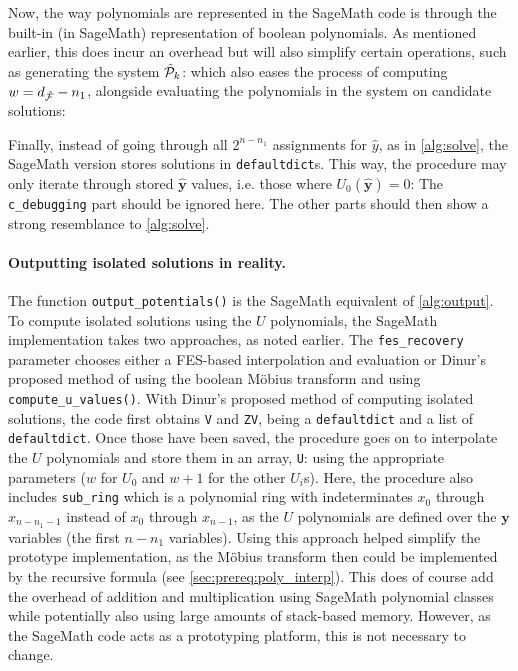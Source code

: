 Now, the way polynomials are represented in the SageMath code is through the built-in (in SageMath) representation of boolean polynomials. As mentioned earlier, this does incur an overhead but will also simplify certain operations, such as generating the system $\Tilde{\mathcal{P}}_k$:
which also eases the process of computing $w = d_{\Tilde{\mathcal{F}}} - n_1$,
alongside evaluating the polynomials in the system on candidate solutions:

Finally, instead of going through all $2^{n - n_1}$ assignments for $\hat{y}$, as in \cref{alg:solve}, the SageMath version stores solutions in \texttt{defaultdict}s. This way, the procedure may only iterate through stored $\hat{\mathbf{y}}$ values, i.e. those where $U_0(\hat{\mathbf{y}}) = 0$:
The \texttt{c\_debugging} part should be ignored here. The other parts should then show a strong resemblance to \cref{alg:solve}.

\paragraph{Outputting isolated solutions in reality.} The function \texttt{output\_potentials()} is the SageMath equivalent of \cref{alg:output}. To compute isolated solutions using the $U$ polynomials, the SageMath implementation takes two approaches, as noted earlier. The \texttt{fes\_recovery} parameter chooses either a FES-based interpolation and evaluation or Dinur's proposed method of using the boolean Möbius transform and using \texttt{compute\_u\_values()}. With Dinur's proposed method of computing isolated solutions, the code first obtains \texttt{V} and \texttt{ZV}, being a \texttt{defaultdict} and a list of \texttt{defaultdict}. Once those have been saved, the procedure goes on to interpolate the $U$ polynomials and store them in an array, \texttt{U}:
using the appropriate parameters ($w$ for $U_0$ and $w + 1$ for the other $U_i$s). Here, the procedure also includes \texttt{sub\_ring} which is a polynomial ring with indeterminates $x_0$ through $x_{n - n_1 - 1}$ instead of $x_0$ through $x_{n - 1}$, as the $U$ polynomials are defined over the $\mathbf{y}$ variables (the first $n - n_1$ variables). Using this approach helped simplify the prototype implementation, as the Möbius transform then could be implemented by the recursive formula (see \cref{sec:prereq:poly_interp}). This does of course add the overhead of addition and multiplication using SageMath polynomial classes while potentially also using large amounts of stack-based memory. However, as the SageMath code acts as a prototyping platform, this is not necessary to change.


